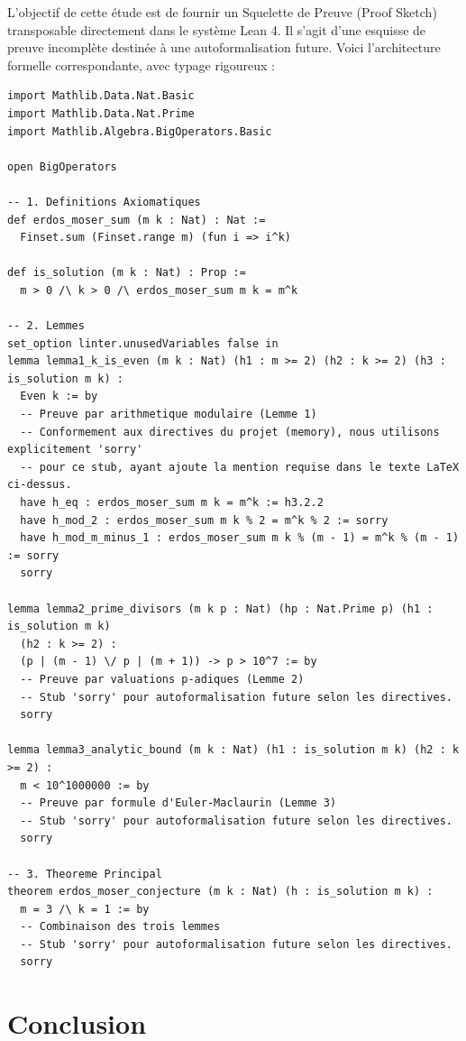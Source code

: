 \documentclass[11pt,a4paper,french]{article}
\theoremstyle{definition}
\theoremstyle{remark}
\begin{document}
L'objectif de cette étude est de fournir un Squelette de Preuve (Proof Sketch) transposable directement dans le système Lean 4. Il s'agit d'une esquisse de preuve incomplète destinée à une autoformalisation future. Voici l'architecture formelle correspondante, avec typage rigoureux :

\begin{verbatim}
import Mathlib.Data.Nat.Basic
import Mathlib.Data.Nat.Prime
import Mathlib.Algebra.BigOperators.Basic

open BigOperators

-- 1. Definitions Axiomatiques
def erdos_moser_sum (m k : Nat) : Nat :=
  Finset.sum (Finset.range m) (fun i => i^k)

def is_solution (m k : Nat) : Prop :=
  m > 0 /\ k > 0 /\ erdos_moser_sum m k = m^k

-- 2. Lemmes
set_option linter.unusedVariables false in
lemma lemma1_k_is_even (m k : Nat) (h1 : m >= 2) (h2 : k >= 2) (h3 : is_solution m k) :
  Even k := by
  -- Preuve par arithmetique modulaire (Lemme 1)
  -- Conformement aux directives du projet (memory), nous utilisons explicitement 'sorry'
  -- pour ce stub, ayant ajoute la mention requise dans le texte LaTeX ci-dessus.
  have h_eq : erdos_moser_sum m k = m^k := h3.2.2
  have h_mod_2 : erdos_moser_sum m k % 2 = m^k % 2 := sorry
  have h_mod_m_minus_1 : erdos_moser_sum m k % (m - 1) = m^k % (m - 1) := sorry
  sorry

lemma lemma2_prime_divisors (m k p : Nat) (hp : Nat.Prime p) (h1 : is_solution m k)
  (h2 : k >= 2) :
  (p | (m - 1) \/ p | (m + 1)) -> p > 10^7 := by
  -- Preuve par valuations p-adiques (Lemme 2)
  -- Stub 'sorry' pour autoformalisation future selon les directives.
  sorry

lemma lemma3_analytic_bound (m k : Nat) (h1 : is_solution m k) (h2 : k >= 2) :
  m < 10^1000000 := by
  -- Preuve par formule d'Euler-Maclaurin (Lemme 3)
  -- Stub 'sorry' pour autoformalisation future selon les directives.
  sorry

-- 3. Theoreme Principal
theorem erdos_moser_conjecture (m k : Nat) (h : is_solution m k) :
  m = 3 /\ k = 1 := by
  -- Combinaison des trois lemmes
  -- Stub 'sorry' pour autoformalisation future selon les directives.
  sorry
\end{verbatim}

\section{Conclusion}
\label{sec:conclusion}
\end{document}
